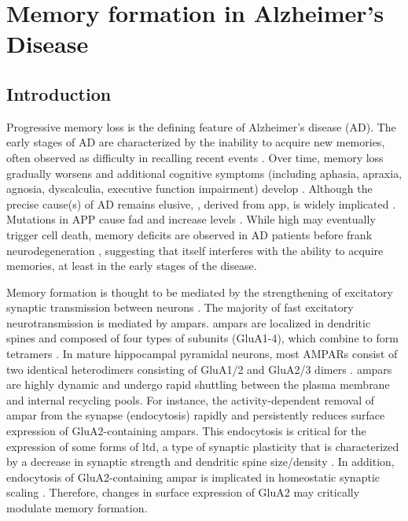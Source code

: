 \chapter{Memory formation in Alzheimer's Disease \label{chap-ad}}
\section{Introduction}

Progressive memory loss is the defining feature of Alzheimer’s disease (AD).  The early stages of AD are characterized by the inability to acquire new memories, often observed as difficulty in recalling recent events \citep{albert96, storandt89, wilson83}. Over time, memory loss gradually worsens and additional cognitive symptoms (including aphasia, apraxia, agnosia, dyscalculia, executive function impairment) develop \citep{shah06}. Although the precise cause(s) of AD remains elusive, \abeta{}, derived from \gls{app}, is widely implicated \citep{selkoe02, tanzi01}. Mutations in APP cause \gls{fad} \citep{hardy02,price98} and increase \abeta{} levels \citep{cai93, citron92}.  While high \abeta{} may eventually trigger cell death, memory deficits are observed in AD patients before frank neurodegeneration \citep{selkoe02}, suggesting that \abeta{} itself interferes with the ability to acquire memories, at least in the early stages of the disease.  

Memory formation is thought to be mediated by the strengthening of excitatory synaptic transmission between neurons \citep{bailey93, lamprecht04}.  The majority of fast excitatory neurotransmission is mediated by \glspl{ampar}.  \Glspl{ampar} are localized in dendritic spines and composed of four types of subunits (GluA1-4), which combine to form tetramers \citep{hollmann94}.  In mature hippocampal pyramidal neurons, most AMPARs consist of two identical heterodimers consisting of GluA1/2 and GluA2/3 dimers \citep{wenthold96}.  \Glspl{ampar} are highly dynamic and undergo rapid shuttling between the plasma membrane and internal recycling pools. For instance, the activity-dependent removal of \gls{ampar} from the synapse (endocytosis) rapidly and persistently reduces surface expression of GluA2-containing \glspl{ampar}. This endocytosis is critical for the expression of some forms of \gls{ltd}, a type of synaptic plasticity that is characterized by a decrease in synaptic strength and dendritic spine size/density \citep{collingridge04, malinow02, zhou04}. In addition, endocytosis of GluA2-containing \gls{ampar} is implicated in homeostatic synaptic scaling \citep{gainey09}. Therefore, changes in surface expression of GluA2 may critically modulate memory formation.  

